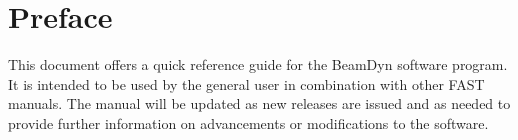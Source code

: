 \chapter*{Preface}
This document offers a quick reference guide for the BeamDyn software program. It is intended to be used by the general user in combination with other FAST manuals. The manual will be updated as new releases are issued and as needed to provide further information on advancements or modifications to the software.